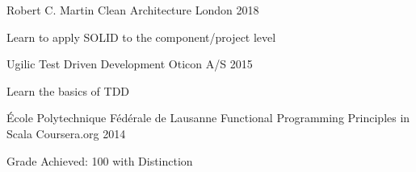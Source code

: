 

\begin{cventries}


  \cventry
    {Robert C. Martin} %
    {Clean Architecture} %
    {London} %
    {2018} %
    {
      \begin{cvitems} %
        \item {Learn to apply SOLID to the component/project level}
      \end{cvitems}
    }

  \cventry
    {Ugilic} %
    {Test Driven Development} %
    {Oticon A/S} %
    {2015} %
    {
      \begin{cvitems} %
        \item {Learn the basics of TDD}
      \end{cvitems}
    }

  \cventry
    {École Polytechnique Fédérale de Lausanne} %
    {Functional Programming Principles in Scala} %
    {Coursera.org} %
    {2014} %
    {
      \begin{cvitems} %
        \item {Grade Achieved: 100 with Distinction}
      \end{cvitems}
    }

\end{cventries}
